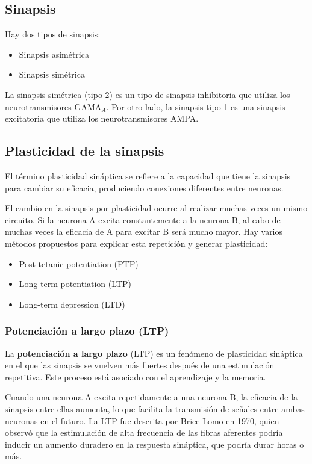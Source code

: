 \documentclass[12pt, letterpaper]{article}
\begin{document}
\subsection{Sinapsis}
Hay dos tipos de sinapsis:
\begin{itemize}
    \item Sinapsis asimétrica
    \item Sinapsis simétrica 
\end{itemize}

La sinapsis simétrica (tipo 2) es un tipo de sinapsis inhibitoria que utiliza los neurotransmisores GAMA$_A$. Por otro lado, la sinapsis tipo 1 es una sinapsis excitatoria que utiliza los neurotransmisores AMPA. 


\subsection{Plasticidad de la sinapsis}
El término plasticidad sináptica se refiere a la capacidad que tiene la sinapsis para cambiar su eficacia, produciendo conexiones diferentes entre neuronas.

El cambio en la sinapsis por plasticidad ocurre al realizar muchas veces un mismo circuito. Si la neurona A excita constantemente a la neurona B, al cabo de muchas veces la eficacia de A para excitar B será mucho mayor. Hay varios métodos propuestos para explicar esta repetición y generar plasticidad:
\begin{itemize}
    \item Post-tetanic potentiation (PTP)
    \item Long-term potentiation (LTP)
    \item Long-term depression (LTD)
\end{itemize}

\subsubsection{Potenciación a largo plazo (LTP)}
La \textbf{potenciación a largo plazo} (LTP) es un fenómeno de plasticidad sináptica en el que las sinapsis se vuelven más fuertes después de una estimulación repetitiva. Este proceso está asociado con el aprendizaje y la memoria.

Cuando una neurona A excita repetidamente a una neurona B, la eficacia de la sinapsis entre ellas aumenta, lo que facilita la transmisión de señales entre ambas neuronas en el futuro. La LTP fue descrita por Brice Lomo en 1970, quien observó que la estimulación de alta frecuencia de las fibras aferentes podría inducir un aumento duradero en la respuesta sináptica, que podría durar horas o más.
\end{document}

